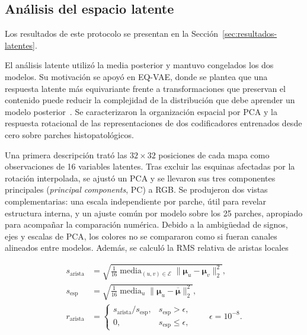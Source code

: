 \subsection{Análisis del espacio latente}
\label{sec:analisis-latente-metodos}

Los resultados de este protocolo se presentan en la
Sección~\ref{sec:resultados-latentes}.

El análisis latente utilizó la media posterior y mantuvo congelados los dos
modelos. Su motivación se apoyó en EQ-VAE, donde se plantea que una respuesta
latente más equivariante frente a transformaciones que preservan el contenido
puede reducir la complejidad de la distribución que debe aprender un modelo
posterior~\cite{kouzelis_eqvae_2025}. Se caracterizaron la organización espacial por PCA y la respuesta
rotacional de las representaciones de dos codificadores entrenados desde cero
sobre parches histopatológicos.

Una primera descripción trató las \(32\times32\) posiciones de cada mapa como
observaciones de 16 variables latentes. Tras excluir las esquinas afectadas
por la rotación interpolada, se ajustó un PCA y se llevaron sus tres componentes
principales (\emph{principal components}, PC) a RGB. Se produjeron dos vistas complementarias: una escala
independiente por parche, útil para revelar estructura interna, y un ajuste
común por modelo sobre los 25 parches, apropiado para acompañar la comparación
numérica. Debido a la ambigüedad de signos, ejes y escalas de PCA, los colores
no se compararon como si fueran canales alineados entre modelos. Además, se
calculó la RMS relativa de aristas locales

\begin{equation}
\begin{aligned}
    s_{\mathrm{arista}}
      &=\sqrt{\frac{1}{16}\operatorname{media}_{(u,v)\in\mathcal{E}}
        \lVert\boldsymbol{\mu}_u-\boldsymbol{\mu}_v\rVert_2^2},\\
    s_{\mathrm{esp}}
      &=\sqrt{\frac{1}{16}\operatorname{media}_{u}
        \lVert\boldsymbol{\mu}_u-\overline{\boldsymbol{\mu}}\rVert_2^2},\\
    r_{\mathrm{arista}}
      &=\begin{cases}
          s_{\mathrm{arista}}/s_{\mathrm{esp}}, & s_{\mathrm{esp}}>\epsilon,\\
          0, & s_{\mathrm{esp}}\leq\epsilon,
        \end{cases}
        \qquad \epsilon=10^{-8}.
\end{aligned}
    \label{eq:rms-aristas-latentes}
\end{equation}

